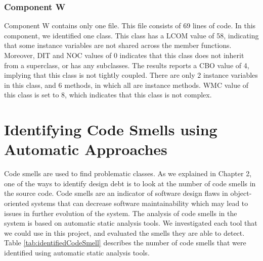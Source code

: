  



\subsubsection{Component W}
Component W contains only one file. This file consists of 69 lines of code. In this component, we identified one class. This class has a LCOM value of 58, indicating that some instance variables are not shared across the member functions. Moreover, DIT and NOC values of 0 indicates that this class does not inherit from a superclass, or has any subclasses. The results reports a CBO value of 4, implying that this class is not tightly coupled. There are only 2 instance variables in this class, and 6 methods, in which all are instance methods. WMC value of this class is set to 8, which indicates that this class is not complex.































\section{Identifying Code Smells using Automatic Approaches}
\label{sub:code_smell_detection}
Code smells are used to find problematic classes.
As we explained in Chapter 2, one of the ways to identify design debt is to look at the number of code smells in the source code. Code smells are an indicator of software design flaws in object-oriented systems that can decrease software maintainability which may lead to issues in further evolution of the system\cite{olbrich2009evolution}. The analysis of code smells in the system is based on automatic static analysis tools. We investigated each tool that we could use in this project, and evaluated the smells they are able to detect. Table \ref{tab:identifiedCodeSmell} describes the number of code smells that were identified using automatic static analysis tools.

